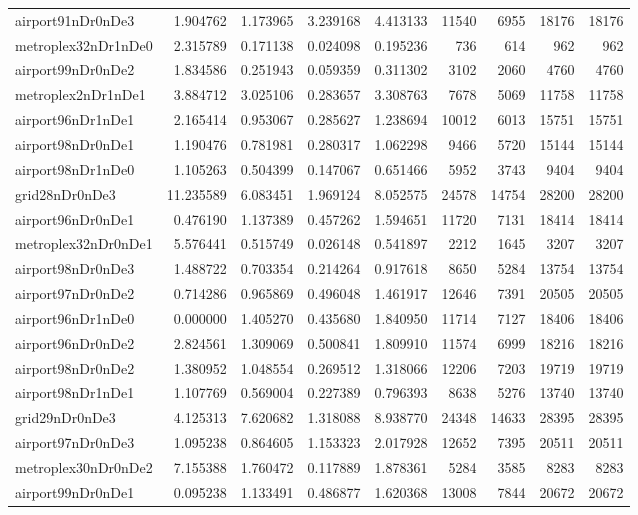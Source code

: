 \begin{longtable}{|l|r|r|r|r|r|r|r|r|}
airport91nDr0nDe3 & 1.904762 & 1.173965 & 3.239168 & 4.413133 & 11540 & 6955 & 18176 & 18176 \\
metroplex32nDr1nDe0 & 2.315789 & 0.171138 & 0.024098 & 0.195236 & 736 & 614 & 962 & 962 \\
airport99nDr0nDe2 & 1.834586 & 0.251943 & 0.059359 & 0.311302 & 3102 & 2060 & 4760 & 4760 \\
metroplex2nDr1nDe1 & 3.884712 & 3.025106 & 0.283657 & 3.308763 & 7678 & 5069 & 11758 & 11758 \\
airport96nDr1nDe1 & 2.165414 & 0.953067 & 0.285627 & 1.238694 & 10012 & 6013 & 15751 & 15751 \\
airport98nDr0nDe1 & 1.190476 & 0.781981 & 0.280317 & 1.062298 & 9466 & 5720 & 15144 & 15144 \\
airport98nDr1nDe0 & 1.105263 & 0.504399 & 0.147067 & 0.651466 & 5952 & 3743 & 9404 & 9404 \\
grid28nDr0nDe3 & 11.235589 & 6.083451 & 1.969124 & 8.052575 & 24578 & 14754 & 28200 & 28200 \\
airport96nDr0nDe1 & 0.476190 & 1.137389 & 0.457262 & 1.594651 & 11720 & 7131 & 18414 & 18414 \\
metroplex32nDr0nDe1 & 5.576441 & 0.515749 & 0.026148 & 0.541897 & 2212 & 1645 & 3207 & 3207 \\
airport98nDr0nDe3 & 1.488722 & 0.703354 & 0.214264 & 0.917618 & 8650 & 5284 & 13754 & 13754 \\
airport97nDr0nDe2 & 0.714286 & 0.965869 & 0.496048 & 1.461917 & 12646 & 7391 & 20505 & 20505 \\
airport96nDr1nDe0 & 0.000000 & 1.405270 & 0.435680 & 1.840950 & 11714 & 7127 & 18406 & 18406 \\
airport96nDr0nDe2 & 2.824561 & 1.309069 & 0.500841 & 1.809910 & 11574 & 6999 & 18216 & 18216 \\
airport98nDr0nDe2 & 1.380952 & 1.048554 & 0.269512 & 1.318066 & 12206 & 7203 & 19719 & 19719 \\
airport98nDr1nDe1 & 1.107769 & 0.569004 & 0.227389 & 0.796393 & 8638 & 5276 & 13740 & 13740 \\
grid29nDr0nDe3 & 4.125313 & 7.620682 & 1.318088 & 8.938770 & 24348 & 14633 & 28395 & 28395 \\
airport97nDr0nDe3 & 1.095238 & 0.864605 & 1.153323 & 2.017928 & 12652 & 7395 & 20511 & 20511 \\
metroplex30nDr0nDe2 & 7.155388 & 1.760472 & 0.117889 & 1.878361 & 5284 & 3585 & 8283 & 8283 \\
airport99nDr0nDe1 & 0.095238 & 1.133491 & 0.486877 & 1.620368 & 13008 & 7844 & 20672 & 20672 \\

\end{longtable}
